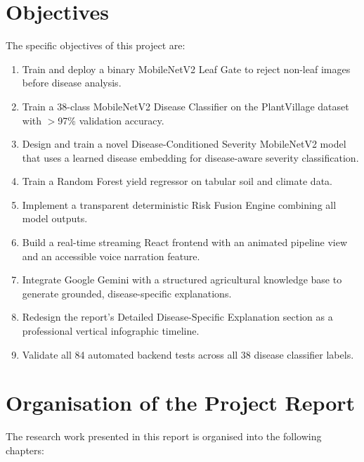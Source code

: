 \section{Objectives}

The specific objectives of this project are:
\begin{enumerate}
    \item Train and deploy a binary MobileNetV2 Leaf Gate to reject non-leaf images before disease analysis.
    \item Train a 38-class MobileNetV2 Disease Classifier on the PlantVillage dataset with $>$97\% validation accuracy.
    \item Design and train a novel Disease-Conditioned Severity MobileNetV2 model that uses a learned disease embedding for disease-aware severity classification.
    \item Train a Random Forest yield regressor on tabular soil and climate data.
    \item Implement a transparent deterministic Risk Fusion Engine combining all model outputs.
    \item Build a real-time streaming React frontend with an animated pipeline view and an accessible voice narration feature.
    \item Integrate Google Gemini with a structured agricultural knowledge base to generate grounded, disease-specific explanations.
    \item Redesign the report's Detailed Disease-Specific Explanation section as a professional vertical infographic timeline.
    \item Validate all 84 automated backend tests across all 38 disease classifier labels.
\end{enumerate}

\section{Organisation of the Project Report}

The research work presented in this report is organised into the following chapters:

